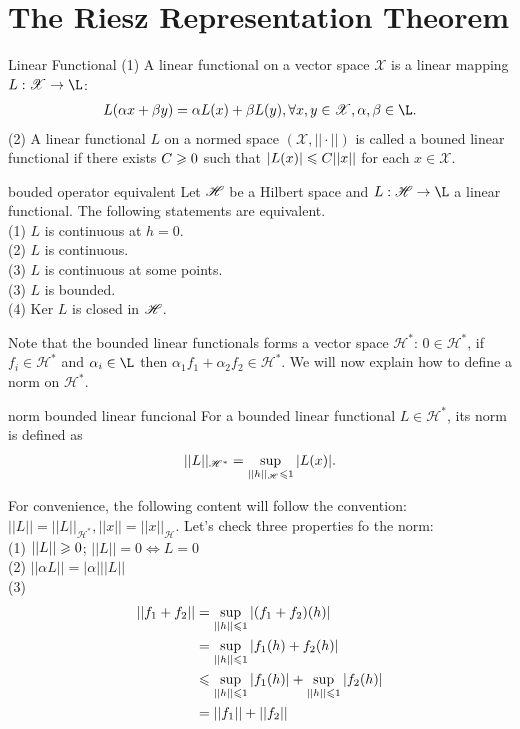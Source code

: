 % 
\chapter{The Riesz Representation Theorem}\label{chp:1_3}


\begin{definition}{Linear Functional}{}
    (1) A linear functional on a vector space $\mathscr{X}$ is a linear mapping $L:\mathscr{X}\rightarrow \L$:
    \begin{align*}
        L(\alpha x+\beta y)= \alpha L(x)+\beta L(y), \forall x,y\in \mathscr{X}, \alpha,\beta \in \L.
    \end{align*}
    (2) A linear functional $L$ on a normed space $(\mathscr{X},||\cdot||)$ is called a bouned linear functional if
    there exists $C\geqslant 0$ such that $|L(x)|\leqslant C||x||$ for each $x\in \mathscr{X}$.      
\end{definition}

\begin{proposition}{}{bouded operator equivalent}
    Let $\mathscr{H}$ be a Hilbert space and $L:\hH\rightarrow \L$ a linear functional. The following statements are equivalent.\\
    (1) $L$ is continuous at $h=0$.\\
    (2) $L$ is continuous.\\
    (3) $L$ is continuous at some points.\\
    (3) $L$ is bounded.\\
    (4) Ker $L$ is closed in $\mathscr{H}$.
\end{proposition}


Note that the bounded linear functionals forms a vector space $\mathscr{H}^*$: $0\in \mathscr{H}^*$, if $f_i\in \mathscr{H}^*$ and $\alpha_i\in \L$ then
$\alpha_1f_1+\alpha_2f_2\in \mathscr{H}^*$. We will now explain how to define a norm on $\mathscr{H}^*$.

\begin{definition}{}{norm bounded linear funcional}
    For a bounded linear functional $L\in \mathscr{H}^*$, its norm is defined as 
    \begin{align*}
        ||L||_{\mathscr{H}^*} = \sup_{||h||_{\mathscr{H}}\leqslant 1}|L(x)|.
    \end{align*}
\end{definition}

For convenience, the following content will follow the convention: $||L||=||L||_{\mathscr{H}^*}, ||x||=||x||_{\mathscr{H}}$.
Let's check three properties fo the norm:\\
(1) $||L||\geqslant0$; $||L||=0\Leftrightarrow L=0$\\
(2) $||\alpha L|| =|\alpha| ||L||$\\
(3) \begin{align*}
    ||f_1+f_2|| &= \sup_{||h||\leqslant 1}|(f_1+f_2)(h)|\\
                &= \sup_{||h||\leqslant 1}|f_1(h)+f_2(h)|\\
                &\leqslant \sup_{||h||\leqslant 1}|f_1(h)| + \sup_{||h||\leqslant 1}|f_2(h)|\\
                &= ||f_1||+||f_2||
\end{align*}
    
